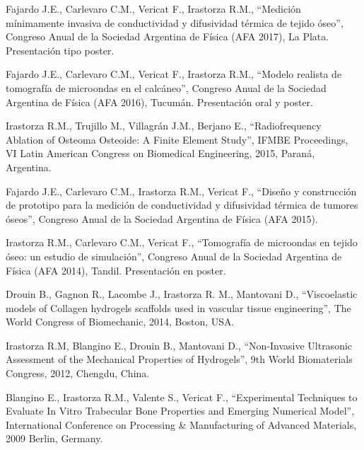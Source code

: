 \documentclass[margin,line]{res}
\begin{document}
\begin{resume}
Fajardo J.E., Carlevaro C.M., Vericat F., Irastorza R.M., ``Medición mínimamente invasiva de conductividad y difusividad térmica de tejido óseo'', Congreso Anual de la Sociedad Argentina de Física (AFA 2017), La Plata. Presentación tipo poster.

Fajardo J.E., Carlevaro C.M., Vericat F., Irastorza R.M., ``Modelo realista de tomografía de microondas en el calcáneo'', Congreso Anual de la Sociedad Argentina de Física (AFA 2016), Tucumán. Presentación oral y poster.

Irastorza R.M., Trujillo M., Villagrán J.M., Berjano E., ``Radiofrequency Ablation of Osteoma Osteoide: A Finite Element Study'', IFMBE Proceedings, VI Latin American Congress on Biomedical Engineering, 2015, Paraná, Argentina. 

Fajardo J.E., Carlevaro C.M., Irastorza R.M., Vericat F., ``Diseño y construcción de prototipo para la medición de conductividad y difusividad térmica de tumores óseos'', Congreso Anual de la Sociedad Argentina de Física (AFA 2015).

Irastorza R.M., Carlevaro C.M., Vericat F., ``Tomografía de microondas en tejido óseo: un estudio de simulación'', Congreso Anual de la Sociedad Argentina de Física (AFA 2014), Tandil. Presentación en poster.

Drouin B., Gagnon R., Lacombe J., Irastorza R. M., Mantovani D., ``Viscoelastic models of Collagen hydrogels scaffolds used in vascular tissue engineering'', The World Congress of Biomechanic, 2014, Boston, USA.

Irastorza R.M, Blangino E., Drouin B., Mantovani D., ``Non-Invasive Ultrasonic Assessment of the Mechanical Properties of Hydrogels'', 9th World Biomaterials Congress, 2012, Chengdu, China.

Blangino E., Irastorza R.M., Valente S., Vericat F., ``Experimental Techniques to Evaluate In Vitro Trabecular Bone Properties and Emerging Numerical Model'', International Conference on Processing \& Manufacturing of Advanced Materials, 2009 Berlin, Germany.
%
%
%


\end{resume}
\end{document}
